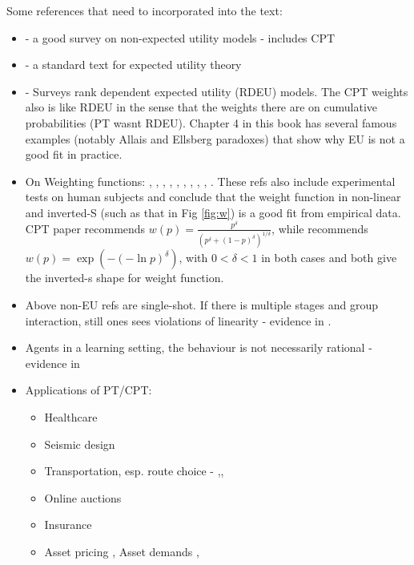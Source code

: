 \documentclass[11pt,letterpaper,english]{article}
\begin{document}
Some references that need to incorporated into the text:
\begin{itemize}
	\item \cite{starmer2000developments} - a good survey on non-expected utility models - includes CPT
	\item \cite{fishburn1970expectedutility} - a standard text for expected utility theory
	\item \cite{quiggin2012generalized} - Surveys  rank dependent expected utility (RDEU) models. The CPT weights also is like RDEU in the sense that the weights there are on cumulative probabilities (PT wasnt RDEU). Chapter 4 in this book has several famous examples (notably Allais and Ellsberg paradoxes) that show why EU is not a good fit in practice.
	\item On Weighting functions: \cite{prelec1998probability}, \cite{wu1996curvature}, \cite{conlisk1989three}, \cite{camerer1989experimental}, \cite{camerer1992recent}, \cite{harless1992predictions}, \cite{sopher1993test}, \cite{camerer1994violations}, \cite{gonzalez1999shape}, \cite{abdellaoui2000parameter}. These refs also include experimental tests on human subjects and conclude that the weight function in non-linear and  inverted-S (such as that in Fig \ref{fig:w}) is a good fit from empirical data. CPT paper \cite{tversky1992advances} recommends $w(p) = \frac{p^{\delta}}{{(p^{\delta}+ (1-p)^{\delta})}^{1/\delta}}$, while \cite{prelec1998probability} recommends $w(p) = \exp(-(-\ln p)^\delta)$, with $0 < \delta <1$ in both cases and both give the inverted-s shape for weight function. 
	\item Above non-EU refs are single-shot. If there is multiple stages and group interaction, still ones sees violations of linearity - evidence in \cite{bone1999groups}. 
	\item Agents in a learning setting, the behaviour is not necessarily rational - evidence in \cite{timmerman1994can}
	\item Applications of PT/CPT:
	\begin{itemize}
		\item Healthcare \cite{lenert1999associations}
		\item Seismic design \cite{goda2008application}
		\item Transportation, esp. route choice  - \cite{gao2010adaptive},\cite{fujii2004drivers}, \cite{ramming2001network}
		\item Online auctions \cite{weinberg2005exploring}
		\item Insurance  \cite{machina1995non}
		\item Asset pricing \cite{barberis1999prospect}, Asset demands \cite{epstein1989substitution}, \cite{epstein1991substitution}
	\end{itemize}
\end{itemize}
\end{document}
